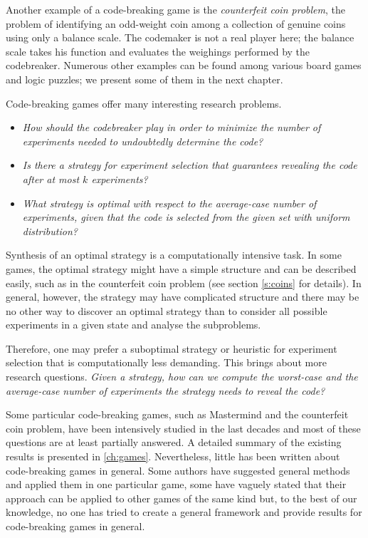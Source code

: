 Another example of a code-breaking game is the \emph{counterfeit coin problem},
  the problem of identifying an odd-weight coin among
  a collection of genuine coins using only a balance scale.
The codemaker is not a real player here; the balance scale takes his function
  and evaluates the weighings performed by the codebreaker.
Numerous other examples can be found among various board games and logic puzzles;
 we present some of them in the next chapter.

Code-breaking games offer many interesting research problems.

\begin{itemize}
\item \emph{How should the codebreaker play in order to minimize the number of experiments
   needed to undoubtedly determine the code?}
\item \emph{Is there a strategy for experiment selection that guarantees
   revealing the code after at most $k$ experiments?}
\item \emph{What strategy is optimal with respect
   to the average-case number of experiments,
   given that the code is selected
   from the given set with uniform distribution?}
\end{itemize}

Synthesis of an optimal strategy is a computationally intensive task.
In some games, the optimal strategy might have a simple
  structure and can be described easily, such as in
  the counterfeit coin problem (see section \autoref{s:coins} for details).
In general, however, the strategy may have complicated structure and
  there may be no other way to discover an optimal strategy
  than to consider all possible experiments
  in a given state and analyse the subproblems.

Therefore, one may prefer a suboptimal strategy or heuristic
  for experiment selection that is computationally less demanding.
This brings about more research questions.
\emph{Given a strategy,
  how can we compute the worst-case and the average-case number
  of experiments the strategy needs to reveal the code?}

Some particular code-breaking games,
  such as Mastermind and the counterfeit coin problem,
  have been intensively studied in the last decades
  and most of these questions are at least partially answered.
A detailed summary of the existing results is presented in \autoref{ch:games}.
Nevertheless, little has been written about code-breaking games in general.
Some authors have suggested general methods and applied them in one particular game\cite[e.g.][]{cbg-stgopt, cbg-gen},
  some have vaguely stated that their approach can be applied
  to other games of the same kind but,
  to the best of our knowledge, no one has tried to
  create a general framework and provide
   results for code-breaking games in general.

